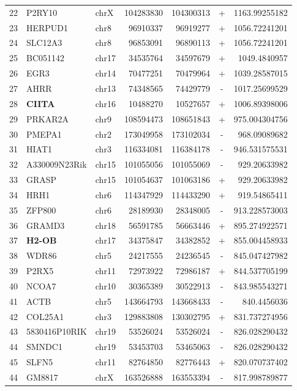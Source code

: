 \begin{table}
\begin{tabular}{rllrrcr}
22 & P2RY10 & chrX & 104283830 & 104300313 & + & 1163.99255182 \\
23 & HERPUD1 & chr8 & 96910337 & 96919277 & + & 1056.72241201 \\
24 & SLC12A3 & chr8 & 96853091 & 96890113 & + & 1056.72241201 \\
25 & BC051142 & chr17 & 34535764 & 34597679 & + & 1049.4840957 \\
26 & EGR3 & chr14 & 70477251 & 70479964 & + & 1039.28587015 \\
27 & AHRR & chr13 & 74348565 & 74429779 & - & 1017.25699529 \\
28 & \textbf{CIITA} & chr16 & 10488270 & 10527657 & + & 1006.89398006 \\
29 & PRKAR2A & chr9 & 108594473 & 108651843 & + & 975.004304756 \\
30 & PMEPA1 & chr2 & 173049958 & 173102034 & - & 968.09089682 \\
31 & HIAT1 & chr3 & 116334081 & 116384178 & - & 946.531575531 \\
32 & A330009N23Rik & chr15 & 101055056 & 101055069 & - & 929.20633982 \\
33 & GRASP & chr15 & 101054637 & 101063186 & + & 929.20633982 \\
34 & HRH1 & chr6 & 114347929 & 114433290 & + & 919.54865411 \\
35 & ZFP800 & chr6 & 28189930 & 28348005 & - & 913.228573003 \\
36 & GRAMD3 & chr18 & 56591785 & 56663446 & + & 895.274922571 \\
37 & \textbf{H2-OB} & chr17 & 34375847 & 34382852 & + & 855.004458933 \\
38 & WDR86 & chr5 & 24217555 & 24236545 & - & 845.047427982 \\
39 & P2RX5 & chr11 & 72973922 & 72986187 & + & 844.537705199 \\
40 & NCOA7 & chr10 & 30365389 & 30522913 & - & 843.985543271 \\
41 & ACTB & chr5 & 143664793 & 143668433 & - & 840.4456036 \\
42 & COL25A1 & chr3 & 129883808 & 130302795 & + & 831.737274956 \\
43 & 5830416P10RIK & chr19 & 53526024 & 53526024 & - & 826.028290432 \\
44 & SMNDC1 & chr19 & 53453703 & 53465063 & - & 826.028290432 \\
45 & SLFN5 & chr11 & 82764850 & 82776443 & + & 820.070737402 \\
44 & GM8817 & chrX & 163526888 & 163553394 & - & 817.998789877 \\

\end{tabular}
\end{table}
